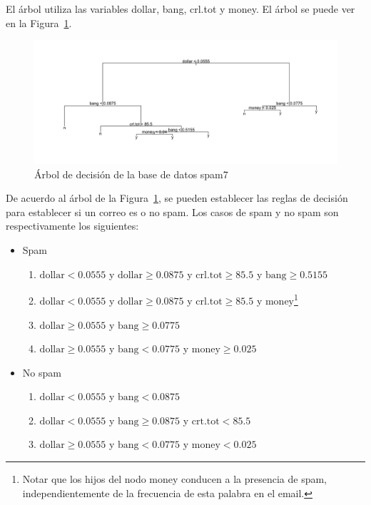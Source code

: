 \documentclass[12pt,a4paper,twoside,openright,titlepage,final]{article}
\begin{document}
El árbol utiliza las variables dollar, bang, crl.tot y money. El árbol se puede ver en la Figura~\ref{fig:spam_plot}.\\

\begin{figure}[tbph!]
\centering
\includegraphics[width=0.9\linewidth]{imagenes/spam_plot}
\caption{Árbol de decisión de la base de datos spam7}
\label{fig:spam_plot}
\end{figure}

De acuerdo al árbol de la Figura~\ref{fig:spam_plot}, se pueden establecer las reglas de decisión para establecer si un correo es o no spam. Los casos de spam y no spam son respectivamente los siguientes:

\begin{itemize}
	\item Spam
	
	\begin{enumerate}
		\item $\text{dollar} < 0.0555$ y $\text{dollar} \geq 0.0875$ y $\text{crl.tot} \geq 85.5$ y $\text{bang} \geq 0.5155$
		
		\item $\text{dollar} < 0.0555$ y $\text{dollar} \geq 0.0875$ y $\text{crl.tot} \geq 85.5$ y $\text{money}$\footnote{Notar que los hijos del nodo money conducen a la presencia de spam, independientemente de la frecuencia de esta palabra en el email.}
		
		\item $\text{dollar} \geq 0.0555$ y $\text{bang} \geq 0.0775$
		
		\item $\text{dollar} \geq 0.0555$ y $\text{bang} < 0.0775$ y $\text{money} \geq 0.025$
	\end{enumerate}
	
	\item No spam
	
	\begin{enumerate}
		\item $\text{dollar} < 0.0555$ y $\text{bang} < 0.0875$
		
		\item $\text{dollar} < 0.0555$ y $\text{bang} \geq 0.0875$ y $\text{crt.tot} < 85.5$
		
		\item $\text{dollar} \geq 0.0555$ y $\text{bang} < 0.0775$ y $\text{money} < 0.025$
		
	\end{enumerate}
\end{itemize}
\end{document}
